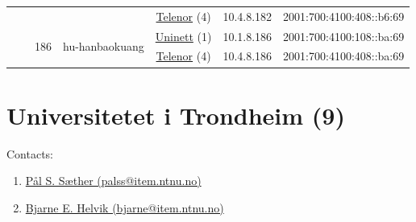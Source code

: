 \begin{small}
\begin{center}
\begin{longtable}{|c|c|c|c|c|c|c|c|}
  &  &  &  & \multicolumn{2}{|c|}{\tiny{\href{https://www.telenor.no}{Telenor} (4)}} & \tiny{10.4.8.182} & \tiny{2001:700:4100:408::b6:69} \\* \cline{3-3}\cline{4-4}\cline{5-5}\cline{6-6}\cline{7-7}\cline{8-8}
  &  & \multirow{2}{*}{\tiny{186}} & \multicolumn{1}{|l|}{\multirow{2}{*}{\tiny{hu-hanbaokuang}}} & \multicolumn{2}{|c|}{\tiny{\href{https://www.uninett.no}{Uninett} (1)}} & \tiny{10.1.8.186} & \tiny{2001:700:4100:108::ba:69} \\* \cline{5-5}\cline{6-6}\cline{7-7}\cline{8-8}
  &  &  &  & \multicolumn{2}{|c|}{\tiny{\href{https://www.telenor.no}{Telenor} (4)}} & \tiny{10.4.8.186} & \tiny{2001:700:4100:408::ba:69} \\ \hline
\end{longtable}
\end{center}
\end{small}



\section{Universitetet i Trondheim (9)}
\label{sec:NTNU}

Contacts:\begin{enumerate}
 \item {}\href{mailto:palss@item.ntnu.no}{Pål S. Sæther (palss@item.ntnu.no)}
 \item {}\href{mailto:bjarne@item.ntnu.no}{Bjarne E. Helvik (bjarne@item.ntnu.no)}
\end{enumerate}

